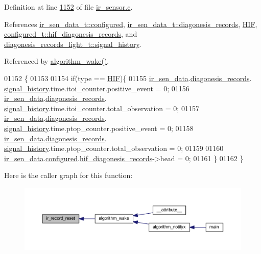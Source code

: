 Definition at line \hyperlink{a00045_source_l01152}{1152} of file \hyperlink{a00045_source}{ir\+\_\+sensor.\+c}.



References \hyperlink{a00023_source_l00040}{ir\+\_\+sen\+\_\+data\+\_\+t\+::configured}, \hyperlink{a00023_source_l00053}{ir\+\_\+sen\+\_\+data\+\_\+t\+::diagonesis\+\_\+records}, \hyperlink{a00017_source_l00022}{H\+I\+F}, \hyperlink{a00021_source_l00206}{configured\+\_\+t\+::hif\+\_\+diagonesis\+\_\+records}, and \hyperlink{a00017_affb63906d23cb1cb7787d61eaaedfb60}{diagonesis\+\_\+records\+\_\+light\+\_\+t\+::signal\+\_\+history}.



Referenced by \hyperlink{a00038_source_l00670}{algorithm\+\_\+wake()}.


\begin{DoxyCode}
01152                                 \{
01153 
01154     \textcolor{keywordflow}{if}(type == \hyperlink{a00017_aaa1c1ffe30eff38b979b1af9d4e4ef19}{HIF})\{
01155             \hyperlink{a00045_a73dfacb46242746440accc76c7ef710d}{ir\_sen\_data}.\hyperlink{a00023_a7ae905b560513ad201e58c2f63375030}{diagonesis\_records}.
      \hyperlink{a00017_affb63906d23cb1cb7787d61eaaedfb60}{signal\_history}.time.itoi\_counter.positive\_event      = 0;
01156             \hyperlink{a00045_a73dfacb46242746440accc76c7ef710d}{ir\_sen\_data}.\hyperlink{a00023_a7ae905b560513ad201e58c2f63375030}{diagonesis\_records}.
      \hyperlink{a00017_affb63906d23cb1cb7787d61eaaedfb60}{signal\_history}.time.itoi\_counter.total\_observation   = 0;
01157             \hyperlink{a00045_a73dfacb46242746440accc76c7ef710d}{ir\_sen\_data}.\hyperlink{a00023_a7ae905b560513ad201e58c2f63375030}{diagonesis\_records}.
      \hyperlink{a00017_affb63906d23cb1cb7787d61eaaedfb60}{signal\_history}.time.ptop\_counter.positive\_event      = 0;
01158             \hyperlink{a00045_a73dfacb46242746440accc76c7ef710d}{ir\_sen\_data}.\hyperlink{a00023_a7ae905b560513ad201e58c2f63375030}{diagonesis\_records}.
      \hyperlink{a00017_affb63906d23cb1cb7787d61eaaedfb60}{signal\_history}.time.ptop\_counter.total\_observation   = 0;
01159 
01160             \hyperlink{a00045_a73dfacb46242746440accc76c7ef710d}{ir\_sen\_data}.\hyperlink{a00023_a94b2d1f6ea4ab334c74d24984dd27843}{configured}.\hyperlink{a00021_ae18294f7499d9fcb5ec796a1816b8cd8}{hif\_diagonesis\_records}->head 
      = 0;
01161        \}
01162 \}
\end{DoxyCode}


Here is the caller graph for this function\+:\nopagebreak
\begin{figure}[H]
\begin{center}
\leavevmode
\includegraphics[width=350pt]{d4/d51/a00017_a1c9872e93491d95a24ab0bc723d39a74_icgraph}
\end{center}
\end{figure}


